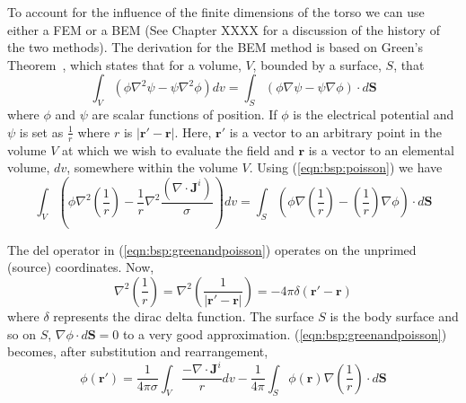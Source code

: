 To account for the influence of the finite dimensions of the torso we can use
either a FEM or a BEM (See Chapter XXXX for a discussion
of the history of the two methods).
The derivation for the BEM method is based on Green's
Theorem~\cite{Barr1966,Gulrajani1989,Clayton2002},
which states that for a volume, $V$, bounded by a surface, $S$, that
\begin{equation}
\label{eqn:bsp:green}
\int_{V} \left(\phi \nabla^{2}\psi - \psi \nabla^{2}\phi  \right) dv =
\int_{S} \left( \phi \nabla \psi - \psi \nabla \phi \right) \cdot d\mathbf{S}
\end{equation}
where $\phi$ and $\psi$ are scalar functions of position.
If $\phi$ is the electrical potential and $\psi$ is set as $\frac{1}{r}$ where
$r$ is $|\mathbf{r'}-\mathbf{r}|$.
Here, $\mathbf{r'}$ is a vector to an arbitrary point in the volume $V$ at which
we wish to evaluate the field and $\mathbf{r}$ is a vector to an elemental
volume, $dv$, somewhere within the volume $V$.
Using (\ref{eqn:bsp:poisson}) we have
\begin{equation}
\label{eqn:bsp:greenandpoisson}
\int_{V}
    \left(
        \phi \nabla^{2}\left(\frac{1}{r}\right) -
        \frac{1}{r} \nabla^{2}\frac{\left(\nabla \cdot \mathbf{J}^{i} \right)}{\sigma}
    \right)
dv =
\int_{S}
    \left(
        \phi \nabla \left(\frac{1}{r}\right) -
        \left(\frac{1}{r}\right) \nabla \phi
    \right)
\cdot d\mathbf{S}
\end{equation}

The del operator in (\ref{eqn:bsp:greenandpoisson}) operates on the unprimed (source) coordinates.
Now,
\begin{equation}
\label{eqn:bsp:oneoverr}
\nabla^{2}\left(\frac{1}{r}\right) =
\nabla^{2}\left(\frac{1}{|\mathbf{r'}-\mathbf{r}|}\right) =
-4\pi\delta\left(\mathbf{r'}-\mathbf{r}\right)
\end{equation}
where $\delta$ represents the dirac delta function.  The surface $S$ is the body
surface and so on $S$, $\nabla\phi \cdot d\mathbf{S} = 0$ to a very good
approximation.  (\ref{eqn:bsp:greenandpoisson}) becomes, after substitution and
rearrangement,
\begin{equation}
\label{eqn:bsp:substituted}
\phi\left(\mathbf{r'}\right) =
\frac{1}{4 \pi \sigma}\int_{V} \frac{-\nabla \cdot \mathbf{J}^{i}}{r}dv - 
\frac{1}{4 \pi}\int_{S} \phi\left(\mathbf{r}\right)
\nabla\left(\frac{1}{r}\right) \cdot d\mathbf{S}
\end{equation}

